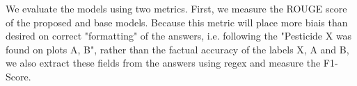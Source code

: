 We evaluate the models using two metrics. First, we measure the ROUGE score of the proposed and base models. 
Because this metric will place more biais than desired on correct "formatting" of the answers, i.e. following the "Pesticide X was found on plots A, B", rather than the factual accuracy of the labels X, A and B, we also extract these fields from the answers using regex and measure the F1-Score. 